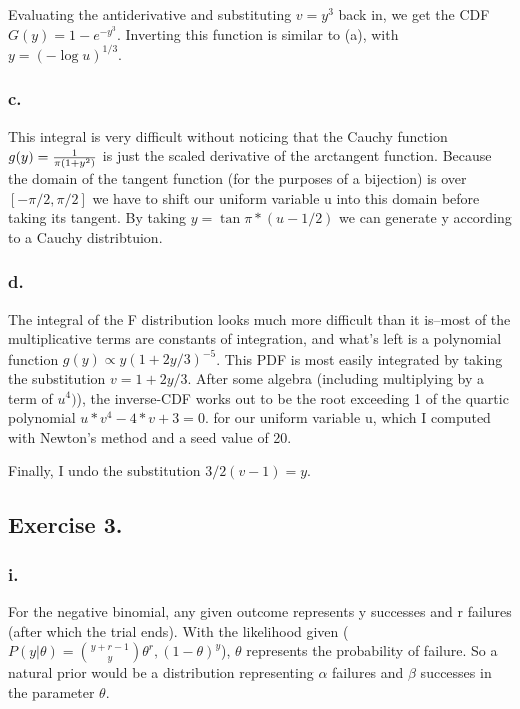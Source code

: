 \documentclass{article}
\begin{document}
Evaluating the antiderivative and substituting \(v = y^3\) back in, 
we get the CDF  \(G(y) = 1 - e^{-y^3}\). Inverting this function
is similar to (a), with \(y = (-\log{u})^{1/3}\).

\subsubsection{c.}

This integral is very difficult without noticing that the Cauchy function \(g(y) = {1 \over \pi (1 + y^2)}\) is just the scaled derivative
of the arctangent function. Because the domain of the tangent function (for the purposes of a bijection)
is over \([-\pi/2, \pi/2]\) we have to shift our uniform variable u into this domain
before taking its tangent. By taking \(y = \tan{\pi*(u - 1/2)}\) we can generate y according to a Cauchy distribtuion.

\subsubsection{d.}

The integral of the F distribution looks much more difficult than it is--most of the multiplicative terms
are constants of integration, and what's left is a polynomial function \(g(y) \propto y(1 + 2y/3)^{-5}\).
This PDF is most easily integrated by taking the substitution \(v = 1 + 2y/3\). After some algebra (including
multiplying by a term of \(u^4)\)), the inverse-CDF
works out to be the root exceeding 1 of the quartic polynomial \(u*v^4 - 4*v + 3 = 0\).
for our uniform variable u, which I computed with Newton's method and a seed value of 20.

Finally, I undo the substitution \(3/2(v - 1)= y\).




\subsection{Exercise 3.}



\subsubsection{i.}

For the negative binomial, any given outcome represents y successes and r failures (after which
the trial ends).
With the likelihood given (\(P(y\vert \theta) = {y + r - 1 \choose y}\theta^r, (1 - \theta)^y\)), 
\(\theta\) represents the probability of failure.
So a natural prior would be a distribution representing
\(\alpha\) failures and \(\beta\) successes in the parameter \(\theta\).
\end{document}
